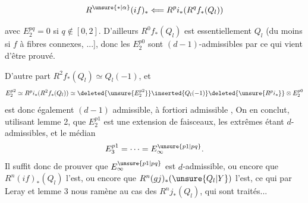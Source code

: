 \[
R^{\unsure{*|\alpha}}(if)_*\Longleftarrow R^pi_*(R^qf_*(Q_l))
\]

avec \(E_2^{pq}=0\) si \(q\notin[0,2]\).
D'ailleurs \(R^0f_*(Q_l)\) est essentiellement \(Q_l\)
(du moins si \(f\) à fibres connexes, 
...],
donc les  \(E_2^{p0}\) sont
\((d-1)\)-admissibles par  ce qui vient d'être prouvé.

 D'autre part \(R^2f_*(Q_l)\simeq Q_l(-1)\), et
\[
E_2^{p2}\simeq R^pi_*(R^2f_*(Q_l))
\simeq\deleted{\unsure{E_2^{p2}}}
\inserted{Q_l(-1)}\deleted{\unsure{R^pi_*}}\otimes E_2^{p0}
\]
est donc également \((d-1)\) admissible, à fortiori
admissible
,
 On en conclut, utilisant lemme 2,
que \(E_2^{p1}\) est une extension de  faisceaux,
les extrêmes étant  \(d\)-admissibles,
et le médian 
\[
E_3^{p1}=\cdots=E_\infty^{\unsure{p1|pq}}.
\]
Il suffit donc de prouver que \(E_\infty^{\unsure{p1|pq}}\) est \(d\)-admissible,
ou encore que \(R^n(if)_*(Q_l)\) l'est, ou encore que
\(R^n(gj)_*(\unsure{Q_l|Y})\) l'est,
ce qui par Leray et lemme 3 nous ramène au cas des
\(R^nj_*(Q_l)\), qui sont traités...
